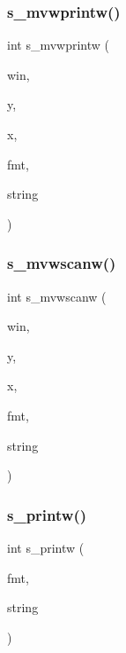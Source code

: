 \subsubsection{\texorpdfstring{s\+\_\+mvwprintw()}{s\_mvwprintw()}}
{\footnotesize\ttfamily int s\+\_\+mvwprintw (\begin{DoxyParamCaption}\item[{W\+I\+N\+D\+OW $\ast$}]{win,  }\item[{int}]{y,  }\item[{int}]{x,  }\item[{const char $\ast$}]{fmt,  }\item[{char $\ast$}]{string }\end{DoxyParamCaption})}

\mbox{\label{C-macros_8c_ad40ae826be88925237db3a46518ca603}} 
\subsubsection{\texorpdfstring{s\+\_\+mvwscanw()}{s\_mvwscanw()}}
{\footnotesize\ttfamily int s\+\_\+mvwscanw (\begin{DoxyParamCaption}\item[{W\+I\+N\+D\+OW $\ast$}]{win,  }\item[{int}]{y,  }\item[{int}]{x,  }\item[{char $\ast$}]{fmt,  }\item[{char $\ast$}]{string }\end{DoxyParamCaption})}

\mbox{\label{C-macros_8c_a952575ee46d2e04849c57062c2cb769e}} 
\subsubsection{\texorpdfstring{s\+\_\+printw()}{s\_printw()}}
{\footnotesize\ttfamily int s\+\_\+printw (\begin{DoxyParamCaption}\item[{const char $\ast$}]{fmt,  }\item[{char $\ast$}]{string }\end{DoxyParamCaption})}

